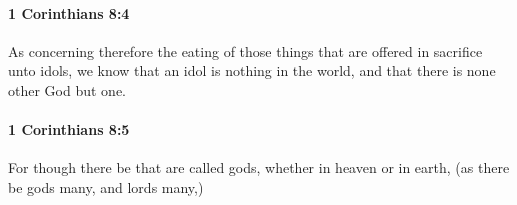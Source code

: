 		\paragraph{1 Corinthians 8:4} %
			\label{1CORINTHIANS-8-4}

			As concerning therefore the eating of those things that are offered in sacrifice unto idols, we know that an idol is nothing in the world, and that there is none other God but one.

			\begin{framed}
			\scriptsize
				\begin{compactdesc}
					\item[SBLG] 
				\end{compactdesc}
			\end{framed}

		\paragraph{1 Corinthians 8:5} %
			\label{1CORINTHIANS-8-5}

			For though there be that are called gods, whether in heaven or in earth, (as there be gods many, and lords many,)

